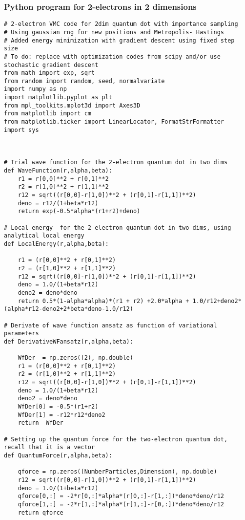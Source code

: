\documentclass{beamer}
\begin{document}
\begin{frame}
\frametitle{Python program for 2-electrons in 2 dimensions}

\begin{verbatim}
# 2-electron VMC code for 2dim quantum dot with importance sampling
# Using gaussian rng for new positions and Metropolis- Hastings 
# Added energy minimization with gradient descent using fixed step size
# To do: replace with optimization codes from scipy and/or use stochastic gradient descent
from math import exp, sqrt
from random import random, seed, normalvariate
import numpy as np
import matplotlib.pyplot as plt
from mpl_toolkits.mplot3d import Axes3D
from matplotlib import cm
from matplotlib.ticker import LinearLocator, FormatStrFormatter
import sys



# Trial wave function for the 2-electron quantum dot in two dims
def WaveFunction(r,alpha,beta):
    r1 = r[0,0]**2 + r[0,1]**2
    r2 = r[1,0]**2 + r[1,1]**2
    r12 = sqrt((r[0,0]-r[1,0])**2 + (r[0,1]-r[1,1])**2)
    deno = r12/(1+beta*r12)
    return exp(-0.5*alpha*(r1+r2)+deno)

# Local energy  for the 2-electron quantum dot in two dims, using analytical local energy
def LocalEnergy(r,alpha,beta):
    
    r1 = (r[0,0]**2 + r[0,1]**2)
    r2 = (r[1,0]**2 + r[1,1]**2)
    r12 = sqrt((r[0,0]-r[1,0])**2 + (r[0,1]-r[1,1])**2)
    deno = 1.0/(1+beta*r12)
    deno2 = deno*deno
    return 0.5*(1-alpha*alpha)*(r1 + r2) +2.0*alpha + 1.0/r12+deno2*(alpha*r12-deno2+2*beta*deno-1.0/r12)

# Derivate of wave function ansatz as function of variational parameters
def DerivativeWFansatz(r,alpha,beta):
    
    WfDer  = np.zeros((2), np.double)
    r1 = (r[0,0]**2 + r[0,1]**2)
    r2 = (r[1,0]**2 + r[1,1]**2)
    r12 = sqrt((r[0,0]-r[1,0])**2 + (r[0,1]-r[1,1])**2)
    deno = 1.0/(1+beta*r12)
    deno2 = deno*deno
    WfDer[0] = -0.5*(r1+r2)
    WfDer[1] = -r12*r12*deno2
    return  WfDer

# Setting up the quantum force for the two-electron quantum dot, recall that it is a vector
def QuantumForce(r,alpha,beta):

    qforce = np.zeros((NumberParticles,Dimension), np.double)
    r12 = sqrt((r[0,0]-r[1,0])**2 + (r[0,1]-r[1,1])**2)
    deno = 1.0/(1+beta*r12)
    qforce[0,:] = -2*r[0,:]*alpha*(r[0,:]-r[1,:])*deno*deno/r12
    qforce[1,:] = -2*r[1,:]*alpha*(r[1,:]-r[0,:])*deno*deno/r12
    return qforce
    


\end{verbatim}
\end{frame}
\end{document}
